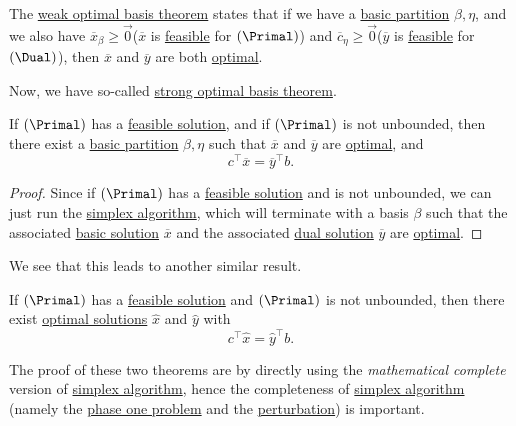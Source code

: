 \begin{prev}
	The \hyperref[thm:weak-optimal-basis-theorem]{weak optimal basis theorem} states that if we have a \hyperref[def:basic-partition]{basic partition} \(\beta, \eta\), and we also have \(\overline{x}_{\beta}\geq \vec{0}\)(\(\overline{x}\) is \hyperref[def:feasible-solution]{feasible} for \((\Primal)\)) and \(\overline{c}_{\eta} \geq \vec{0}\)(\(\overline{y}\) is \hyperref[def:feasible-solution]{feasible} for \((\Dual)\)), then \(\overline{x}\) and \(\overline{y}\) are both \hyperref[def:optimal-solution]{optimal}.
\end{prev}

Now, we have so-called \hyperref[thm:strong-optimal-basis]{strong optimal basis theorem}.

\begin{theorem}\label{thm:strong-optimal-basis}
	If \((\Primal)\) has a \hyperref[def:feasible-solution]{feasible solution}, and if \((\Primal)\) is not unbounded, then there exist a \hyperref[def:basic-partition]{basic partition} \(\beta, \eta\) such that \(\overline{x}\) and \(\overline{y}\) are \hyperref[def:optimal-solution]{optimal}, and
	\[
		c^{\top} \overline{x} = \overline{y}^{\top} b.
	\]
\end{theorem}
\begin{proof}
	Since if \((\Primal)\) has a \hyperref[def:feasible-solution]{feasible solution} and is not unbounded, we can just run the \hyperref[algo:simplex-algorithm]{simplex algorithm}, which will terminate with a basis \(\beta\) such that the associated \hyperref[def:basic-solution]{basic solution} \(\overline{x}\) and the associated \hyperref[def:dual-basic-solution]{dual solution} \(\overline{y}\) are \hyperref[def:optimal-solution]{optimal}.
\end{proof}

We see that this leads to another similar result.

\begin{theorem}\label{thm:strong-duality}
	If \((\Primal)\) has a \hyperref[def:feasible-solution]{feasible solution} and \((\Primal)\) is not unbounded, then there exist \hyperref[def:optimal-solution]{optimal solutions} \(\hat{x}\) and \(\hat{y}\) with
	\[
		c^{\top} \hat{x} = \hat{y}^{\top} b.
	\]
\end{theorem}

\begin{note}
	The proof of these two theorems are by directly using the \emph{mathematical complete} version of \hyperref[algo:simplex-algorithm]{simplex algorithm}, hence the completeness of \hyperref[algo:simplex-algorithm]{simplex algorithm} (namely the \hyperref[def:phase-one-problem]{phase one problem} and the \hyperref[def:perturbed-problem]{perturbation}) is important.
\end{note}

